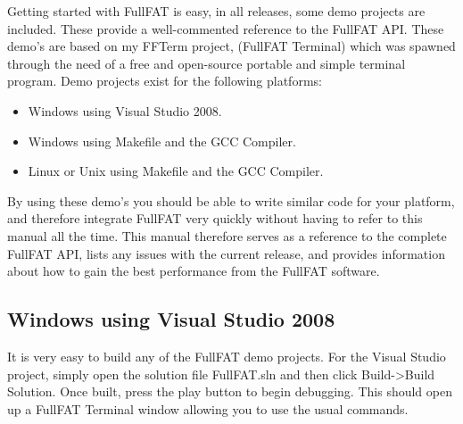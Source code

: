Getting started with FullFAT is easy, in all releases, some demo projects are included. These provide a well-commented reference to the FullFAT API. These demo's are based on my FFTerm project, (FullFAT Terminal) which was spawned through the need of a free and open-source portable and simple terminal program.
\newline
\newline
Demo projects exist for the following platforms:
\begin{itemize}
\item Windows using Visual Studio 2008.
\item Windows using Makefile and the GCC Compiler.
\item Linux or Unix using Makefile and the GCC Compiler.
\end{itemize}

By using these demo's you should be able to write similar code for your platform, and therefore integrate FullFAT very quickly without having to refer to this manual all the time. This manual therefore serves as a reference to the complete FullFAT API, lists any issues with the current release, and provides information about how to gain the best performance from the FullFAT software.

\subsection{Windows using Visual Studio 2008}
	It is very easy to build any of the FullFAT demo projects. For the Visual Studio project, simply open the solution file FullFAT.sln and then click Build->Build Solution. Once built, press the play button to begin debugging. This should open up a FullFAT Terminal window allowing you to use the usual commands.

